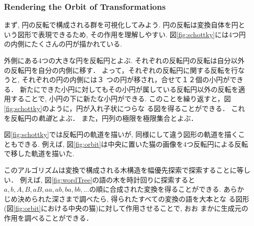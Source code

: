 \subsubsection{Rendering the Orbit of Transformations}

まず, 円の反転で構成される群を可視化してみよう.
円の反転は変換自体を円という図形で表現できるため, その作用を理解しやすい.
図\ref{fig:schottky}には4つ円の内側にたくさんの円が描かれている.

外側にある4つの大きな円を反転円とよぶ.
それぞれの反転円の反転は自分以外の反転円を自分の内側に移す．
よって，それぞれの反転円に関する反転を行なうと, それぞれの円の内側には３
つの円が移され，合せて１２個の小円ができる．
新たにできた小円に対してもその小円が属している反転円以外の反転を適用することで, 小円の下に新たな小円ができる.
このことを繰り返すと，図\ref{fig:schottky}のように，円が入れ子状につらな
る図を得ることができる．
これを反転円の\emph{軌道}とよぶ．
また，円列の極限を極限集合とよぶ．

図\ref{fig:schottky}では反転円の軌道を描いが, 同様にして違う図形の軌道を描くこともできる.
例えば, 図\ref{fig:orbit}は中央に置いた猫の画像を4つ反転円による反転で移した軌道を描いた.

このアルゴリズムは変換で構成される木構造を幅優先探索で探索することに等しい．
例えば, 図\ref{fig:wordTree}の語の木を時計回りに探索すると$a, b, A, B,
aB, aa, ab, ba, bb, ...$の順に合成された変換を得ることができる.
あらかじめ決められた深さまで調べたら, 得られたすべての変換の語を大本とな
る図形(図\ref{fig:orbit}における中央の猫)に対して作用させることで, おお
まかに生成元の作用を調べることができる．

